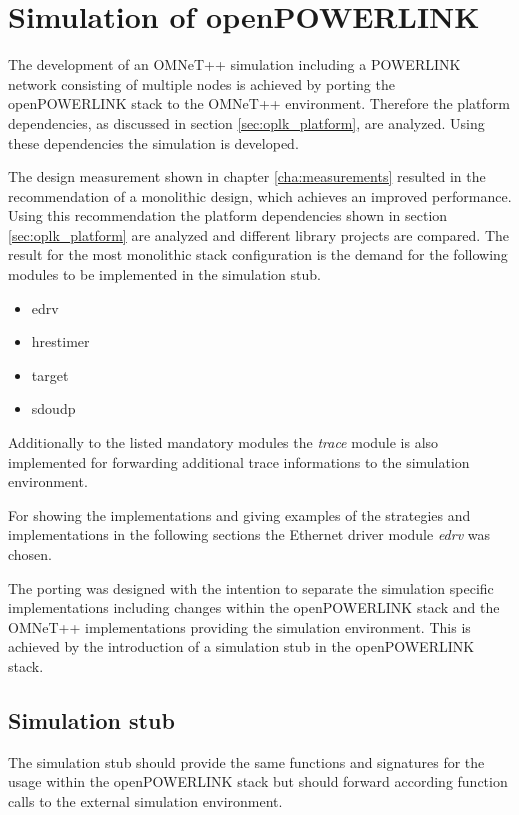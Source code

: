 \chapter{Simulation of openPOWERLINK}
\label{cha:porting}
\begin{sloppypar}
The development of an OMNeT++ simulation including a POWERLINK network consisting of multiple nodes is achieved by porting the openPOWERLINK stack to the OMNeT++ environment.
Therefore the platform dependencies, as discussed in section \ref{sec:oplk_platform}, are analyzed.
Using these dependencies the simulation is developed.
\end{sloppypar}

The design measurement shown in chapter \ref{cha:measurements} resulted in the recommendation of a monolithic design, which achieves an improved performance.
Using this recommendation the platform dependencies shown in section \ref{sec:oplk_platform} are analyzed and different library projects are compared.
The result for the most monolithic stack configuration is the demand for the following modules to be implemented in the simulation stub.

\begin{itemize}
    \item edrv
    \item hrestimer
    \item target
    \item sdoudp
\end{itemize}

Additionally to the listed mandatory modules the \emph{trace} module is also implemented for forwarding additional trace informations to the simulation environment.

For showing the implementations and giving examples of the strategies and implementations in the following sections the Ethernet driver module \emph{edrv} was chosen.

The porting was designed with the intention to separate the simulation specific implementations including changes within the openPOWERLINK stack and the OMNeT++ implementations providing the simulation environment.
This is achieved by the introduction of a simulation stub in the openPOWERLINK stack.

\section{Simulation stub}
\label{sec:porting_simstub}

The simulation stub should provide the same functions and signatures for the usage within the openPOWERLINK stack but should forward according function calls to the external simulation environment.

